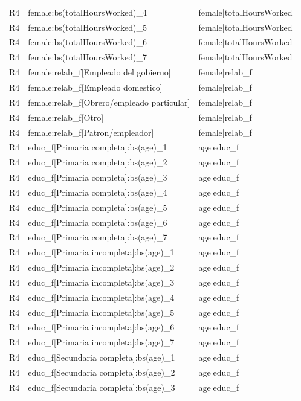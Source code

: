 \begin{longtable}{lll}
R4 & female:bs(totalHoursWorked)\_4 & female|totalHoursWorked \\
R4 & female:bs(totalHoursWorked)\_5 & female|totalHoursWorked \\
R4 & female:bs(totalHoursWorked)\_6 & female|totalHoursWorked \\
R4 & female:bs(totalHoursWorked)\_7 & female|totalHoursWorked \\
R4 & female:relab\_f[Empleado del gobierno] & female|relab\_f \\
R4 & female:relab\_f[Empleado domestico] & female|relab\_f \\
R4 & female:relab\_f[Obrero/empleado particular] & female|relab\_f \\
R4 & female:relab\_f[Otro] & female|relab\_f \\
R4 & female:relab\_f[Patron/empleador] & female|relab\_f \\
R4 & educ\_f[Primaria completa]:bs(age)\_1 & age|educ\_f \\
R4 & educ\_f[Primaria completa]:bs(age)\_2 & age|educ\_f \\
R4 & educ\_f[Primaria completa]:bs(age)\_3 & age|educ\_f \\
R4 & educ\_f[Primaria completa]:bs(age)\_4 & age|educ\_f \\
R4 & educ\_f[Primaria completa]:bs(age)\_5 & age|educ\_f \\
R4 & educ\_f[Primaria completa]:bs(age)\_6 & age|educ\_f \\
R4 & educ\_f[Primaria completa]:bs(age)\_7 & age|educ\_f \\
R4 & educ\_f[Primaria incompleta]:bs(age)\_1 & age|educ\_f \\
R4 & educ\_f[Primaria incompleta]:bs(age)\_2 & age|educ\_f \\
R4 & educ\_f[Primaria incompleta]:bs(age)\_3 & age|educ\_f \\
R4 & educ\_f[Primaria incompleta]:bs(age)\_4 & age|educ\_f \\
R4 & educ\_f[Primaria incompleta]:bs(age)\_5 & age|educ\_f \\
R4 & educ\_f[Primaria incompleta]:bs(age)\_6 & age|educ\_f \\
R4 & educ\_f[Primaria incompleta]:bs(age)\_7 & age|educ\_f \\
R4 & educ\_f[Secundaria completa]:bs(age)\_1 & age|educ\_f \\
R4 & educ\_f[Secundaria completa]:bs(age)\_2 & age|educ\_f \\
R4 & educ\_f[Secundaria completa]:bs(age)\_3 & age|educ\_f \\

\end{longtable}
